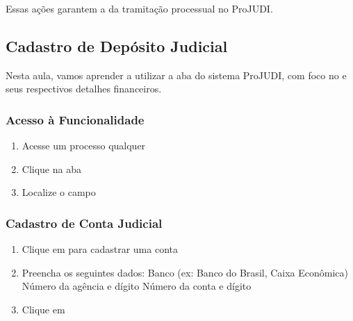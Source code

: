 \documentclass[letterpaper,10pt,brazil]{sphinxmanual}
\begin{document}
\sphinxAtStartPar
Essas ações garantem a  da tramitação processual no ProJUDI.

\sphinxstepscope


\subsection{Cadastro de Depósito Judicial}
\label{\detokenize{projud_20_cadastrodeposito:cadastro-de-deposito-judicial}}\label{\detokenize{projud_20_cadastrodeposito::doc}}
\sphinxAtStartPar
Nesta aula, vamos aprender a utilizar a aba  do sistema ProJUDI, com foco no  e seus respectivos detalhes financeiros.


\subsubsection{Acesso à Funcionalidade}
\label{\detokenize{projud_20_cadastrodeposito:acesso-a-funcionalidade}}\begin{enumerate}
%
\item {} 
\sphinxAtStartPar
Acesse um processo qualquer

\item {} 
\sphinxAtStartPar
Clique na aba 

\item {} 
\sphinxAtStartPar
Localize o campo 

\end{enumerate}


\subsubsection{Cadastro de Conta Judicial}
\label{\detokenize{projud_20_cadastrodeposito:cadastro-de-conta-judicial}}\begin{enumerate}
%
\item {} 
\sphinxAtStartPar
Clique em  para cadastrar uma conta

\item {} 
\sphinxAtStartPar
Preencha os seguintes dados:
\sphinxhyphen{} Banco (ex: Banco do Brasil, Caixa Econômica)
\sphinxhyphen{} Número da agência e dígito
\sphinxhyphen{} Número da conta e dígito

\item {} 
\sphinxAtStartPar
Clique em 

\end{enumerate}
\end{document}
